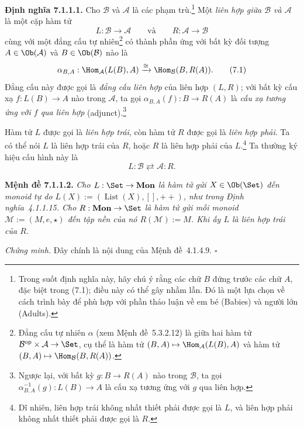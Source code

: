 \noindent\textbf{Định nghĩa 7.1.1.1.}\keepwithnext
Cho $\mathcal B$ và $\mathcal A$ là các phạm trù.\footnote{Trong suốt định nghĩa này, hãy chú ý rằng các chữ $B$ đứng trước các chữ $A$, đặc biệt trong (7.1); điều này có thể gây nhầm lẫn. Đó là một lựa chọn về cách trình bày để phù hợp với phần thảo luận về em bé (Babies) và người lớn (Adults).} Một \emph{liên hợp giữa $\mathcal B$ và $\mathcal A$} là một cặp hàm tử
\[
L:\mathcal B\longrightarrow\mathcal A
\qquad\text{và}\qquad
R:\mathcal A\longrightarrow\mathcal B
\]
cùng với một đẳng cấu tự nhiên\footnote{Đẳng cấu tự nhiên $\alpha$ (xem Mệnh đề~5.3.2.12) là giữa hai hàm tử $\mathcal B^{\mathrm{op}}\times\mathcal A\to\Set$, cụ thể là hàm tử $(B,A)\mapsto\Hom_{\mathcal A}(L(B),A)$ và hàm tử $(B,A)\mapsto\Hom_{\mathcal B}(B,R(A))$.} có thành phần ứng với bất kỳ đối tượng $A\in\Ob(\mathcal A)$ và $B\in\Ob(\mathcal B)$ nào là
\begin{equation}
\alpha_{B,A}:\Hom_{\mathcal A}(L(B),A)\xrightarrow{\cong}\Hom_{\mathcal B}(B,R(A)).\tag{7.1}
\end{equation}
Đẳng cấu này được gọi là \emph{đẳng cấu liên hợp} của liên hợp $(L,R)$; với bất kỳ cấu xạ $f:L(B)\to A$ nào trong $\mathcal A$, ta gọi $\alpha_{B,A}(f):B\to R(A)$ là \emph{cấu xạ tương ứng với $f$ qua liên hợp} (adjunct).\footnote{Ngược lại, với bất kỳ $g:B\to R(A)$ nào trong $\mathcal B$, ta gọi $\alpha^{-1}_{B,A}(g):L(B)\to A$ là cấu xạ tương ứng với $g$ qua liên hợp.}

Hàm tử $L$ được gọi là \emph{liên hợp trái}, còn hàm tử $R$ được gọi là \emph{liên hợp phải}. Ta có thể nói $L$ là liên hợp trái của $R$, hoặc $R$ là liên hợp phải của $L$.\footnote{Dĩ nhiên, liên hợp trái không nhất thiết phải được gọi là $L$, và liên hợp phải không nhất thiết phải được gọi là $R$.} Ta thường ký hiệu cấu hình này là
\begin{equation}
L:\mathcal B\rightleftarrows\mathcal A:R.\tag{7.2}
\end{equation}

\noindent\textbf{Mệnh đề 7.1.1.2.}\keepwithnext
\emph{Cho $L:\Set\to\mathbf{Mon}$ là hàm tử gửi $X\in\Ob(\Set)$ đến monoid tự do $L(X):=(\operatorname{List}(X),[],\mathbin{+\!+})$, như trong Định nghĩa~4.1.1.15. Cho $R:\mathbf{Mon}\to\Set$ là hàm tử gửi mỗi monoid $\mathcal M:=(M,e,\star)$ đến tập nền của nó $R(\mathcal M):=M$. Khi ấy $L$ là liên hợp trái của $R$.}

\noindent\textit{Chứng minh.}
Đây chính là nội dung của Mệnh đề~4.1.4.9.
\hfill$\square$

